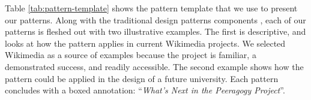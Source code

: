 \begin{refsection}




Table \ref{tab:pattern-template} shows the pattern template that we use to present our patterns.
Along with the traditional design patterns components \cite{meszaros1998pattern}, each of our patterns is fleshed out with two illustrative examples.  The first is descriptive, and looks at how the pattern applies in current Wikimedia projects.  We selected Wikimedia as a source of examples because the project is familiar, a demonstrated success, and readily accessible.  The second example shows how the pattern could be applied in the design of a future university.  Each pattern concludes with a boxed annotation: ``\emph{What's Next in the Peeragogy Project}''.



\end{refsection}
